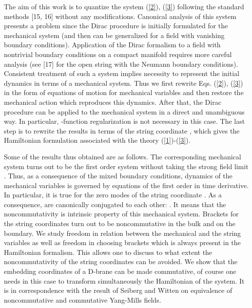 \documentclass[a4paper]{article}
\begin{document}
The aim of this work is to quantize the system (\ref{2}), (\ref{3})
following the standard methods [15, 16] without any modifications.
Canonical analysis of this system presents a problem
since the Dirac procedure is initially formulated for the mechanical
system (and then can be generalized for a field with vanishing boundary
conditions). Application of the Dirac formalism to a field with nontrivial
boundary conditions on a compact manifold requires more careful analysis
(see [17] for the open string with the Neumann boundary conditions).
Consistent treatment of such a system implies necessity to represent
the initial dynamics in terms of a mechanical system. Thus we first
rewrite Eqs. (\ref{2}), (\ref{3}) in the form of equations of motion for
mechanical variables \coordHE{} and then restore the 
mechanical action
which reproduces this dynamics. After that, the Dirac procedure can be
applied to the mechanical system in a direct and unambiguous way. In
particular, \myHighlight{$\delta$}\coordHE{}-function regularization is not necessary in this
case. The last step is to rewrite the results in terms of the string
coordinate \coordHE{}, which gives the Hamiltonian formulation 
associated with the theory (\ref{1})-(\ref{3}).

Some of the results thus obtained are as follows.
The corresponding mechanical system 
turns out to be the first order system without taking the
strong field limit \coordHE{}. 
Thus, as a consequence of the mixed boundary conditions, dynamics of 
the mechanical variables is
governed by equations of the first order in time derivative. In
particular,
it is true for the zero modes \coordHE{} of the string coordinate
\coordHE{}. As a consequence, \coordHE{} are canonically conjugated
to each other: \coordHE{}. It means that the noncommutativity
is intrinsic property of this mechanical system. Brackets for the string
coordinates turn out to be noncommutative in the bulk and on the boundary.
We study freedom in relation between the mechanical and the string
variables as well as freedom in choosing brackets which is always
present in the Hamiltonian formalism. This allows one to discuss to what
extent the noncommutativity of the string coordinates can be avoided.
We show that the embedding coordinates of a D-brane can be made
commutative, of course one needs in this case to transform 
simultaneously the Hamiltonian of the system. 
It is in correspondence with the result of Seiberg and Witten on
equivalence of noncommutative and commutative Yang-Mills fields.
\end{document}
